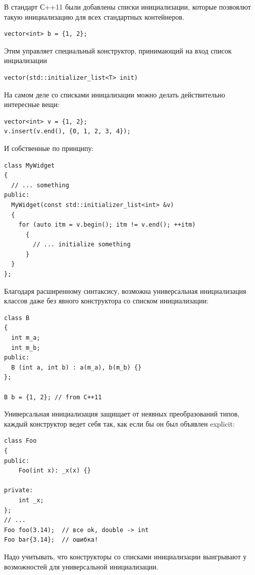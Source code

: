 \documentclass[a4paper,12pt,oneside]{article}
\begin{document}
В стандарт С++11 были добавлены списки инициализации, которые позвоялют такую инициализацию для всех стандартных контейнеров.

\begin{lstlisting}
vector<int> b = {1, 2};
\end{lstlisting}

Этим управляет специальный конструктор, принимающий на вход список инциализации

\begin{lstlisting}
vector(std::initializer_list<T> init)
\end{lstlisting}

На самом деле со списками иницализации можно делать действительно интересные вещи:

\begin{lstlisting}
vector<int> v = {1, 2};
v.insert(v.end(), {0, 1, 2, 3, 4});
\end{lstlisting}

И собственные по принципу:

\begin{lstlisting}
class MyWidget
{
  // ... something
public:
  MyWidget(const std::initializer_list<int> &v) 
  {
    for (auto itm = v.begin(); itm != v.end(); ++itm) 
      {
        // ... initialize something
      }
  }
};
\end{lstlisting}

Благодаря расширенному синтаксису, возможна универсальная инициализация классов даже без явного конструктора со списком инициализации:

\begin{lstlisting}
class B
{
  int m_a;
  int m_b;
public:
  B (int a, int b) : a(m_a), b(m_b) {} 
};

B b = {1, 2}; // from C++11
\end{lstlisting}

Универсальная инициализация защищает от неявных преобразований типов, каждый конструктор ведет себя так, как если бы он был объявлен explicit:

\begin{lstlisting}
class Foo
{
public:
    Foo(int x): _x(x) {}

private:
    int _x;
};
// ...
Foo foo(3.14);  // все ok, double -> int
Foo bar{3.14};  // ошибка!
\end{lstlisting}

Надо учитывать, что конструкторы со списками инициализации выигрывают у возможностей для универсальной инициализации.
\end{document}
